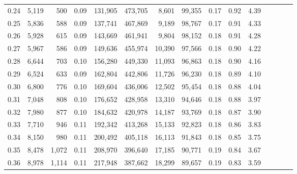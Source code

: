 \begin{tabular}{rrrcrrrrrrrrrrr}
0.24 &   5,119 &    500 &                                       0.09 &  131,905 &  473,705 &    8,601 &   99,355 &  0.17 &  0.92 &                         4.39 \\
0.25 &   5,836 &    588 &                                       0.09 &  137,741 &  467,869 &    9,189 &   98,767 &  0.17 &  0.91 &                         4.33 \\
0.26 &   5,928 &    615 &                                       0.09 &  143,669 &  461,941 &    9,804 &   98,152 &  0.18 &  0.91 &                         4.28 \\
0.27 &   5,967 &    586 &                                       0.09 &  149,636 &  455,974 &   10,390 &   97,566 &  0.18 &  0.90 &                         4.22 \\
0.28 &   6,644 &    703 &                                       0.10 &  156,280 &  449,330 &   11,093 &   96,863 &  0.18 &  0.90 &                         4.16 \\
0.29 &   6,524 &    633 &                                       0.09 &  162,804 &  442,806 &   11,726 &   96,230 &  0.18 &  0.89 &                         4.10 \\
0.30 &   6,800 &    776 &                                       0.10 &  169,604 &  436,006 &   12,502 &   95,454 &  0.18 &  0.88 &                         4.04 \\
0.31 &   7,048 &    808 &                                       0.10 &  176,652 &  428,958 &   13,310 &   94,646 &  0.18 &  0.88 &                         3.97 \\
0.32 &   7,980 &    877 &                                       0.10 &  184,632 &  420,978 &   14,187 &   93,769 &  0.18 &  0.87 &                         3.90 \\
0.33 &   7,710 &    946 &                                       0.11 &  192,342 &  413,268 &   15,133 &   92,823 &  0.18 &  0.86 &                         3.83 \\
0.34 &   8,150 &    980 &                                       0.11 &  200,492 &  405,118 &   16,113 &   91,843 &  0.18 &  0.85 &                         3.75 \\
0.35 &   8,478 &  1,072 &                                       0.11 &  208,970 &  396,640 &   17,185 &   90,771 &  0.19 &  0.84 &                         3.67 \\
0.36 &   8,978 &  1,114 &                                       0.11 &  217,948 &  387,662 &   18,299 &   89,657 &  0.19 &  0.83 &                         3.59 \\

\end{tabular}

